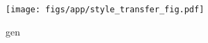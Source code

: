 \begin{figure}[t]
  \centering
  \texttt{[image: figs/app/style\_transfer\_fig.pdf]}
  \caption{gen}
  \label{fig:style_transfer}
\end{figure}